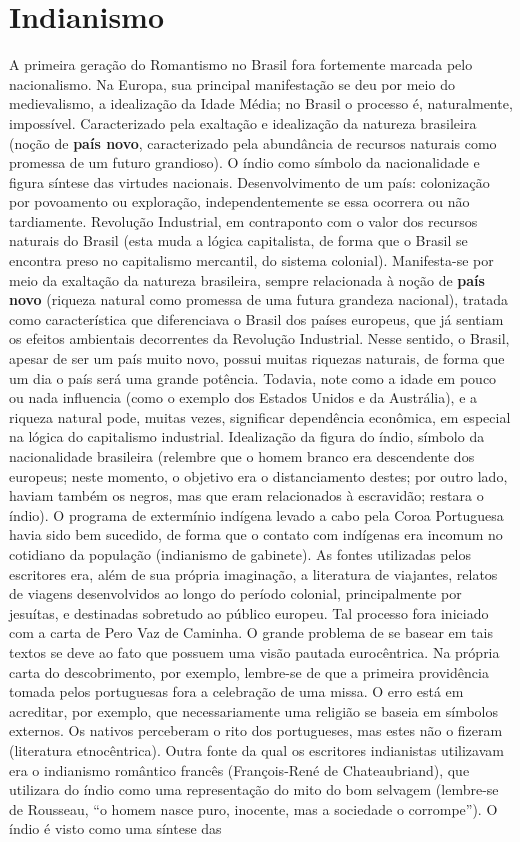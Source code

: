 \documentclass[12pt]{book}
\begin{document}
			\section{Indianismo}
			\par A primeira geração do Romantismo no Brasil fora fortemente marcada pelo nacionalismo. Na Europa, sua principal manifestação se deu por meio do medievalismo, a idealização da Idade Média; no Brasil o processo é, naturalmente, impossível. Caracterizado pela exaltação e idealização da natureza brasileira (noção de \textbf{país novo}, caracterizado pela abundância de recursos naturais como promessa de um futuro grandioso). O índio como símbolo da nacionalidade e figura síntese das virtudes nacionais. Desenvolvimento de um país: colonização por povoamento ou exploração, independentemente se essa ocorrera ou não tardiamente. Revolução Industrial, em contraponto com o valor dos recursos naturais do Brasil (esta muda a lógica capitalista, de forma que o Brasil se encontra preso no capitalismo mercantil, do sistema colonial). Manifesta-se por meio da exaltação da natureza brasileira, sempre relacionada à noção de \textbf{país novo} (riqueza natural como promessa de uma futura grandeza nacional), tratada como característica que diferenciava o Brasil dos países europeus, que já sentiam os efeitos ambientais decorrentes da Revolução Industrial. Nesse sentido, o Brasil, apesar de ser um país muito novo, possui muitas riquezas naturais, de forma que um dia o país será uma grande potência. Todavia, note como a idade em pouco ou nada influencia (como o exemplo dos Estados Unidos e da Austrália), e a riqueza natural pode, muitas vezes, significar dependência econômica, em especial na lógica do capitalismo industrial. Idealização da figura do índio, símbolo da nacionalidade brasileira (relembre que o homem branco era descendente dos europeus; neste momento, o objetivo era o distanciamento destes; por outro lado, haviam também os negros, mas que eram relacionados à escravidão; restara o índio). O programa de extermínio indígena levado a cabo pela Coroa Portuguesa havia sido bem sucedido, de forma que o contato com indígenas era incomum no cotidiano da população (indianismo de gabinete). As fontes utilizadas pelos escritores era, além de sua própria imaginação, a literatura de viajantes, relatos de viagens desenvolvidos ao longo do período colonial, principalmente por jesuítas, e destinadas sobretudo ao público europeu. Tal processo fora iniciado com a carta de Pero Vaz de Caminha. O grande problema de se basear em tais textos se deve ao fato que possuem uma visão pautada eurocêntrica. Na própria carta do descobrimento, por exemplo, lembre-se de que a primeira providência tomada pelos portuguesas fora a celebração de uma missa. O erro está em acreditar, por exemplo, que necessariamente uma religião se baseia em símbolos externos. Os nativos perceberam o rito dos portugueses, mas estes não o fizeram (literatura etnocêntrica). Outra fonte da qual os escritores indianistas utilizavam era o indianismo romântico francês (François-René de Chateaubriand), que utilizara do índio como uma representação do mito do bom selvagem (lembre-se de Rousseau, ``o homem nasce puro, inocente, mas a sociedade o corrompe''). O índio é visto como uma síntese das 
\end{document}
